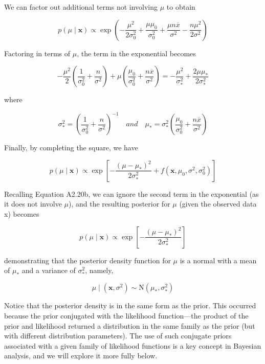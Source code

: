 \documentclass{article}
\begin{document}
We can factor out additional terms not involving  $ \mu $ to obtain

\begin{equation}
p(\mu\mid\mathbf{x})\propto\exp\left(-\frac{\mu^{2}}{2\sigma_{0}^{2}}+\frac{\mu\mu_{0}}{\sigma_{0}^{2}}+\frac{\mu n\overline{x}}{\sigma^{2}}-\frac{n\mu^{2}}{2\sigma^{2}}\right)
\end{equation}

Factoring in terms of  $ \mu $, the term in the exponential becomes

\begin{equation}
-\frac{\mu^{2}}{2}\left(\frac{1}{\sigma_{0}^{2}}+\frac{n}{\sigma^{2}}\right)+\mu\left(\frac{\mu_{0}}{\sigma_{0}^{2}}+\frac{n\overline{x}}{\sigma^{2}}\right)=-\frac{\mu^{2}}{\sigma_{*}^{2}}+\frac{2\mu\mu_{*}}{2\sigma_{*}^{2}}
\end{equation}

where

\begin{equation}
\sigma_{*}^{2}=\left(\frac{1}{\sigma_{0}^{2}}+\frac{n}{\sigma^{2}}\right)^{-1}\quad and\quad\mu_{*}=\sigma_{*}^{2}\left(\frac{\mu_{0}}{\sigma_{0}^{2}}+\frac{n\overline{x}}{\sigma^{2}}\right)
\end{equation}

Finally, by completing the square, we have

\begin{equation}
p(\mu\mid\mathbf{x})\propto\exp\left[-\frac{(\mu-\mu_{*})^{2}}{2\sigma_{*}^{2}}+f(\mathbf{x},\mu_{0},\sigma^{2},\sigma_{0}^{2})\right]
\end{equation}

Recalling Equation A2.20b, we can ignore the second term in the exponential (as it does not involve  $ \mu $), and the resulting posterior for  $ \mu $ (given the observed data x) becomes

\begin{equation}
p(\mu\mid\mathbf{x})\propto\exp\left[-\frac{(\mu-\mu_{*})^{2}}{2\sigma_{*}^{2}}\right]
\end{equation}

demonstrating that the posterior density function for  $ \mu $ is a normal with a mean of  $ \mu_{*} $ and a variance of  $ \sigma_{*}^{2} $, namely,

\begin{equation}
\mu\mid(\mathbf{x},\sigma^{2})\sim\mathrm{N}\left(\mu_{*},\sigma_{*}^{2}\right)
\end{equation}

Notice that the posterior density is in the same form as the prior. This occurred because the prior conjugated with the likelihood function—the product of the prior and likelihood returned a distribution in the same family as the prior (but with different distribution parameters). The use of such conjugate priors associated with a given family of likelihood functions is a key concept in Bayesian analysis, and we will explore it more fully below.
\end{document}
